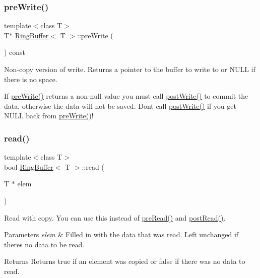 \subsubsection{\texorpdfstring{pre\+Write()}{preWrite()}}
{\footnotesize\ttfamily template$<$class T$>$ \\
T$\ast$ \mbox{\hyperlink{class_ring_buffer}{Ring\+Buffer}}$<$ T $>$\+::pre\+Write (\begin{DoxyParamCaption}{ }\end{DoxyParamCaption}) const\hspace{0.3cm}{\ttfamily [inline]}}



Non-\/copy version of write. Returns a pointer to the buffer to write to or N\+U\+LL if there is no space. 

If \mbox{\hyperlink{class_ring_buffer_a60177190baecb3c438f8392d6f9a35f7}{pre\+Write()}} returns a non-\/null value you must call \mbox{\hyperlink{class_ring_buffer_a7d2e2f6098053c51451ff2bd35fa2252}{post\+Write()}} to commit the data, otherwise the data will not be saved. Don\textquotesingle{}t call \mbox{\hyperlink{class_ring_buffer_a7d2e2f6098053c51451ff2bd35fa2252}{post\+Write()}} if you get N\+U\+LL back from \mbox{\hyperlink{class_ring_buffer_a60177190baecb3c438f8392d6f9a35f7}{pre\+Write()}}! \mbox{\label{class_ring_buffer_af4ab31038d40a4075f4f23b7f2c970cd}} 
\subsubsection{\texorpdfstring{read()}{read()}}
{\footnotesize\ttfamily template$<$class T$>$ \\
bool \mbox{\hyperlink{class_ring_buffer}{Ring\+Buffer}}$<$ T $>$\+::read (\begin{DoxyParamCaption}\item[{T $\ast$}]{elem }\end{DoxyParamCaption})\hspace{0.3cm}{\ttfamily [inline]}}



Read with copy. You can use this instead of \mbox{\hyperlink{class_ring_buffer_a724ce39b381489539fda406e06596a1d}{pre\+Read()}} and \mbox{\hyperlink{class_ring_buffer_aad9eebd3dc4cc774666467de89c6de86}{post\+Read()}}. 


\begin{DoxyParams}{Parameters}
{\em elem} & Filled in with the data that was read. Left unchanged if there\textquotesingle{}s no data to be read.\\
\hline
\end{DoxyParams}
\begin{DoxyReturn}{Returns}
Returns true if an element was copied or false if there was no data to read. 
\end{DoxyReturn}
\mbox{\label{class_ring_buffer_a1a9e393325923ed035b16a5b067a3951}} 
